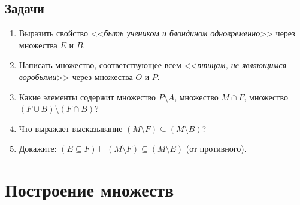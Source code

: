 \subsection{Задачи}
\begin{enumerate}
\item Выразить свойство <<\textit{быть учеником и блондином одновременно}>> через множества $E$ и $B$.
\item Написать множество, соответствующее всем <<\textit{птицам, не являющимся воробьями}>> через множества $O$ и $P$.
\item Какие элементы содержит множество $P\setminus A$, множество $M\cap F$, множество $(F\cup B)\setminus (F\cap B)$?
\item Что выражает высказывание $(M\setminus F)\subseteq (M\setminus B)$?
\item Докажите: $(E\subseteq F)\vdash (M\setminus F)\subseteq (M\setminus E)$ (от противного).
\end{enumerate}


\section{Построение множеств}

